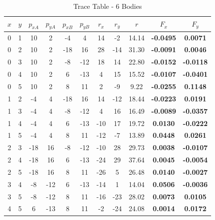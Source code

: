 \begin{table}[H]
\footnotesize
\centering
\caption{Trace Table - 6 Bodies}
\def\arraystretch{1.5}
\begin{tabular}{|c|c|c|c|c|c|c|c|c|c|c|} \hline
$x$ & $y$ & $p_{xA}$ & $p_{yA}$ & $p_{xB}$ & $p_{yB}$ & $r_x$ & $r_y$ & $r$ & $F_x$ & $F_y$ \\ \hline
0	& 1 &	 10 &   2 &	 -4 &	  4 &	 14 &	 -2 &	14.14 &	\textbf{-0.0495} & \textbf{ 0.0071} \\ \hline
0	& 2	&  10	&   2 & -18 &	 16	&  28 &	-14	& 31.30	& \textbf{-0.0091} & \textbf{ 0.0046} \\ \hline
0	& 3	&  10	&   2 &  -8 &	-12	&  18	&  14	& 22.80	& \textbf{-0.0152} & \textbf{-0.0118} \\ \hline
0	& 4	&  10	&   2 &   6 & -13	&   4	&  15	& 15.52	& \textbf{-0.0107} & \textbf{-0.0401} \\ \hline
0	& 5	&  10	&   2 &   8 &  11	&   2	&  -9	&  9.22	& \textbf{-0.0255} & \textbf{ 0.1148} \\ \hline
1	& 2	&  -4	&   4 &	-18 &	 16	&  14	& -12	& 18.44	& \textbf{-0.0223} & \textbf{ 0.0191} \\ \hline
1	& 3	&  -4	&   4 &  -8 &	-12	&   4	&  16	& 16.49	& \textbf{-0.0089} & \textbf{-0.0357} \\ \hline
1	& 4	&  -4	&   4 &   6 &	-13	& -10	&  17	& 19.72	& \textbf{ 0.0130} & \textbf{-0.0222} \\ \hline
1	& 5	&  -4	&   4 &	  8 &  11	& -12	&  -7	& 13.89	& \textbf{ 0.0448} & \textbf{ 0.0261} \\ \hline
2	& 3	& -18	&  16	&  -8 &	-12	& -10	&  28	& 29.73	& \textbf{ 0.0038} & \textbf{-0.0107} \\ \hline
2	& 4	& -18	&  16	&   6 & -13	& -24	&  29	& 37.64	& \textbf{ 0.0045} & \textbf{-0.0054} \\ \hline
2	& 5	& -18	&  16	&   8 &  11	& -26	&   5	& 26.48	& \textbf{ 0.0140} & \textbf{-0.0027} \\ \hline
3	& 4	&  -8	& -12	&   6 & -13	& -14	&   1	& 14.04	& \textbf{ 0.0506} & \textbf{-0.0036} \\ \hline
3	& 5	&  -8	& -12	&   8 &  11	& -16	& -23	& 28.02	& \textbf{ 0.0073} & \textbf{ 0.0105} \\ \hline
4	& 5	&   6	& -13 &	  8 &  11 &	 -2	& -24	& 24.08 &	\textbf{ 0.0014} & \textbf{ 0.0172} \\ \hline
\end{tabular}
\vspace{-40pt}
\end{table}

